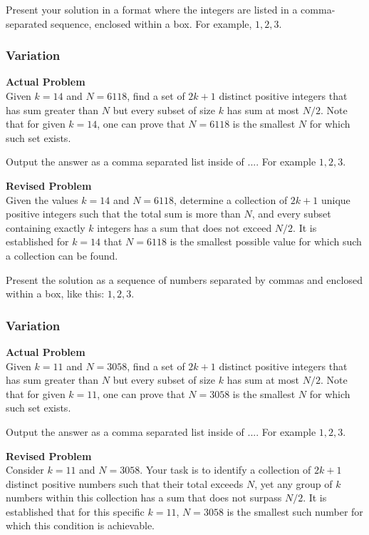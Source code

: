 Present your solution in a format where the integers are listed in a comma-separated sequence, enclosed within a box. For example, \(\boxed{1, 2, 3}\).

\subsubsection{Variation}
\textbf{Actual Problem}\\
Given $k = 14$ and $N = 6118$, find a set of $2k+1$ distinct positive integers that has sum greater than $N$ but every subset of size $k$ has sum at most $N/2$.
Note that for given $k = 14$, one can prove that $N = 6118$ is the smallest $N$ for which such set exists.

Output the answer as a comma separated list inside of $\boxed{...}$. For example $\boxed{1, 2, 3}$.

\textbf{Revised Problem}\\
Given the values \( k = 14 \) and \( N = 6118 \), determine a collection of \( 2k+1 \) unique positive integers such that the total sum is more than \( N \), and every subset containing exactly \( k \) integers has a sum that does not exceed \( N/2 \). It is established for \( k = 14 \) that \( N = 6118 \) is the smallest possible value for which such a collection can be found.

Present the solution as a sequence of numbers separated by commas and enclosed within a box, like this: \(\boxed{1, 2, 3}\).

\subsubsection{Variation}
\textbf{Actual Problem}\\
Given $k = 11$ and $N = 3058$, find a set of $2k+1$ distinct positive integers that has sum greater than $N$ but every subset of size $k$ has sum at most $N/2$.
Note that for given $k = 11$, one can prove that $N = 3058$ is the smallest $N$ for which such set exists.

Output the answer as a comma separated list inside of $\boxed{...}$. For example $\boxed{1, 2, 3}$.

\textbf{Revised Problem}\\
Consider $k = 11$ and $N = 3058$. Your task is to identify a collection of $2k+1$ distinct positive numbers such that their total exceeds $N$, yet any group of $k$ numbers within this collection has a sum that does not surpass $N/2$. It is established that for this specific $k = 11$, $N = 3058$ is the smallest such number for which this condition is achievable.

